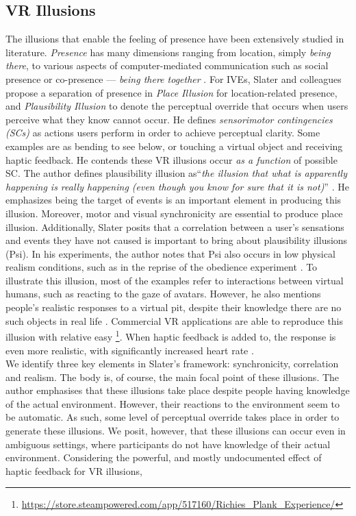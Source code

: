 \subsection{VR Illusions}
The illusions that enable the feeling of presence have been extensively studied in literature. 
\textit{Presence} has many dimensions ranging from location, simply \textit{being there}, to various aspects of computer-mediated communication such as social presence or co-presence --- \textit{being there together} \cite{zhao2003toward}.
For IVEs, Slater and colleagues propose a separation of presence in \textit{Place Illusion} for location-related presence, and \textit{Plausibility Illusion} to denote the perceptual override that occurs when users perceive what they know cannot occur. He defines \textit{sensorimotor contingencies (SCs)} as actions users perform in order to achieve perceptual clarity. Some examples are as bending to see below, or touching a virtual object and receiving haptic feedback. He contends these VR illusions occur \textit{as a function} of possible SC. The author defines plausibility illusion as``\textit{the illusion that what is apparently happening is really happening (even though you know for sure that it is not)}'' \cite{slater2009place}. He emphasizes being the target of events is an important element in producing this illusion. Moreover, motor and visual synchronicity are essential to produce place illusion. Additionally, Slater posits that a correlation between a user's sensations and events they have not caused is important to bring about plausibility illusions (Psi). In his experiments, the author notes that Psi also occurs in low physical realism conditions, such as in the reprise of the obedience experiment \cite{slater2006virtual}. To illustrate this illusion, most of the examples refer to interactions between virtual humans, such as reacting to the gaze of avatars. However, he also mentions people's realistic responses to a virtual pit, despite their knowledge there are no such objects in real life \cite{slater1995taking}. Commercial VR applications are able to reproduce this illusion with relative easy \footnote{\url{https://store.steampowered.com/app/517160/Richies_Plank_Experience/}}. When haptic feedback is added to, the response is even more realistic, with significantly increased heart rate \cite{meehan2002physiological}. 
\\
We identify three key elements in Slater's framework: synchronicity, correlation and realism. The body is, of course, the main focal point of these illusions. The author emphasises that these illusions take place despite people having knowledge of the actual environment. However, their reactions to the environment seem to be automatic. As such, some level of perceptual override takes place in order to generate these illusions. We posit, however, that these illusions can occur even in ambiguous settings, where participants do not have knowledge of their actual environment. Considering the powerful, and mostly undocumented effect of haptic feedback for VR illusions,

